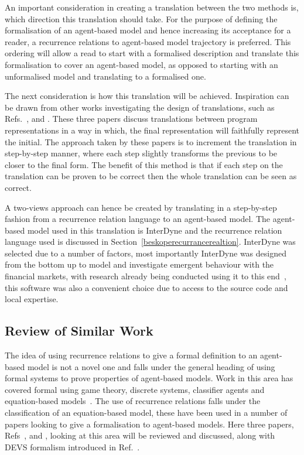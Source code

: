 \documentclass{article}
\begin{document}
An important consideration in creating a translation between the two methods is, which direction this translation should take. For the purpose of defining the formalisation of an agent-based model and hence increasing its acceptance for a reader, a recurrence relations to agent-based model trajectory is preferred. This ordering will allow a read to start with a formalised description and translate this formalisation to cover an agent-based model, as opposed to starting with an unformalised model and translating to a formalised one.     

The next consideration is how this translation will be achieved. Inspiration can be drawn from other works investigating the design of translations, such as Refs.~\cite{clovertrans},  \cite{transproggotmod} and  \cite{stepcorentconv}. These three papers discuss translations between program representations in a way in which, the final representation will faithfully represent the initial. The approach taken by these papers is to increment the translation in step-by-step manner, where each step slightly transforms the previous to be closer to the final form. The benefit of this method is that if each step on the translation can be proven to be correct then the whole translation can be seen as correct. 

A two-views approach can hence be created by translating in a step-by-step fashion from a recurrence relation language to an agent-based model. The agent-based model used in this translation is InterDyne and the recurrence relation language used is discussed in Section~\ref{beskoperecurrancerealtion}. InterDyne was selected due to a number of factors, most importantly InterDyne was designed from the bottom up to model and investigate emergent behaviour with the financial markets, with research already being conducted using it to this end~\cite{DynamicCoupling_Chris}, this software was also a convenient choice due to access to the source code and local expertise.

\subsection{Review of Similar Work}\label{simwork}
The idea of using recurrence relations to give a formal definition to an agent-based model is not a novel one and falls under the general heading of using formal systems to prove properties of agent-based models. Work in this area has covered formal using game theory, discrete systems, classifier agents and equation-based models~\cite{taabm}. The use of recurrence relations falls under the classification of an equation-based model, these have been used in a number of papers looking to give a formalisation to agent-based models. Here three papers, Refs~\cite{ebmabmi}, \cite{econmistsnoabm} and \cite{abmtsd}, looking at this area will be reviewed and discussed, along with DEVS formalism introduced in Ref.~\cite{introdevs}.
\end{document}
